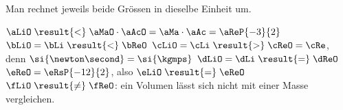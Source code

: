 Man rechnet jeweils beide Grössen in dieselbe Einheit um.
\begin{abcliste}
\abc $\aLiO \;\result{<}\; \aMaO\cdot\aAcO = \aMa\cdot\aAc = \aReP{-3}{2}$
\abc $\bLiO = \bLi \;\result{<}\; \bReO$
\abc $\cLiO = \cLi \;\result{>}\; \cReO = \cRe$, denn $\si{\newton\second} = \si{\kgmps}$
\abc $\dLiO = \dLi \;\result{=}\; \dReO$
\abc $\eReO = \eRsP{-12}{2}$, also $\eLiO \;\result{=}\; \eReO$
\abc $\fLiO \;\result{\neq}\; \fReO$: ein Volumen lässt sich nicht mit einer Masse vergleichen.
\end{abcliste}
